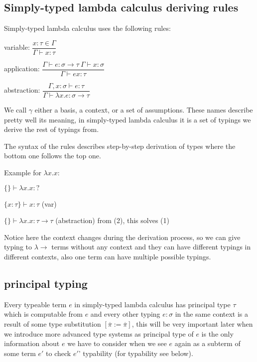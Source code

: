 
\subsection{Simply-typed lambda calculus deriving rules}

Simply-typed lambda calculus uses the following rules:

variable: $
\dfrac{x : \tau \in \Gamma}{\Gamma \vdash x : \tau}
$

application: $
\dfrac{\Gamma \vdash e : \sigma \rightarrow \tau \  \Gamma \vdash x : \sigma}{\Gamma \vdash e x : \tau}
$

abstraction: $
\dfrac{\Gamma, x : \sigma \vdash e : \tau}{\Gamma \vdash \lambda x . e : \sigma \rightarrow \tau}
$

We call $\gamma$ either a basis, a context, or a set of assumptions. These names describe pretty well its meaning, in simply-typed lambda calculus it
is a set of typings we derive the rest of typings from.

The syntax of the rules describes step-by-step derivation of types where the bottom one follows the top one.

Example for $\lambda x . x$:

\begin{listing}
    \item $\{\} \vdash \lambda x . x : ?$
    \item $\{x : \tau\} \vdash x : \tau$ (var)
    \item $\{\} \vdash \lambda x . x : \tau \rightarrow \tau$ (abstraction) from (2), this solves (1)
\end{listing}

Notice here the context changes during the derivation process, so we can give typing to $\lambda\rightarrow$ terms without any context
and they can have different typings in different contexts, also one term can have multiple possible typings.


\subsection{principal typing}

Every typeable term $e$ in simply-typed lambda calculus has principal type $\tau$ which is computable from $e$ and every other typing
$e : \sigma$ in the same context is a result of some type substitution $[\overline{\pi} := \overline{\pi}]$, this will be very important
later when we introduce more advanced type systems as principal type of $e$ is the only information about $e$ we have to consider
when we see $e$ again as a subterm of some term $e'$ to check $e'$' typability (for typability see below). %

